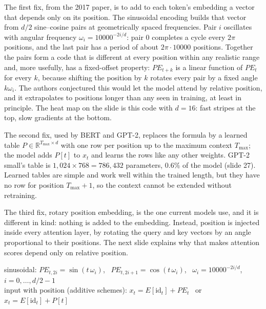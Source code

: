 \documentclass[11pt,letterpaper]{article}
\newenvironment{formulas}{\begin{tcolorbox}[formulabox]}{\end{tcolorbox}}
\newcommand{\Tmax}{T_{\max}}
\begin{document}
The first fix, from the 2017 paper, is to add to each token's embedding a vector that depends only on its position. The sinusoidal encoding builds that vector from $d/2$ sine--cosine pairs at geometrically spaced frequencies. Pair $i$ oscillates with angular frequency $\omega_i=10000^{-2i/d}$: pair 0 completes a cycle every $2\pi$ positions, and the last pair has a period of about $2\pi\cdot10000$ positions. Together the pairs form a code that is different at every position within any realistic range and, more usefully, has a fixed-offset property: $PE_{t+k}$ is a linear function of $PE_t$ for every $k$, because shifting the position by $k$ rotates every pair by a fixed angle $k\omega_i$. The authors conjectured this would let the model attend by relative position, and it extrapolates to positions longer than any seen in training, at least in principle. The heat map on the slide is this code with $d=16$: fast stripes at the top, slow gradients at the bottom.

The second fix, used by BERT and GPT-2, replaces the formula by a learned table $P\in\mathbb{R}^{\Tmax\times d}$ with one row per position up to the maximum context $\Tmax$; the model adds $P[t]$ to $x_t$ and learns the rows like any other weights. GPT-2 small's table is $1{,}024\times768=786{,}432$ parameters, 0.6\% of the model (slide 27). Learned tables are simple and work well within the trained length, but they have no row for position $\Tmax+1$, so the context cannot be extended without retraining.

The third fix, rotary position embedding, is the one current models use, and it is different in kind: nothing is added to the embedding. Instead, position is injected inside every attention layer, by rotating the query and key vectors by an angle proportional to their positions. The next slide explains why that makes attention scores depend only on relative position.

\begin{formulas}
sinusoidal: $PE_{t,2i}=\sin(t\,\omega_i)$, \ $PE_{t,2i+1}=\cos(t\,\omega_i)$, \ $\omega_i=10000^{-2i/d}$, \ $i=0,\dots,d/2-1$\\[3pt]
input with position (additive schemes): $x_t=E[\mathrm{id}_t]+PE_t$ \ or \ $x_t=E[\mathrm{id}_t]+P[t]$
\end{formulas}
\end{document}
